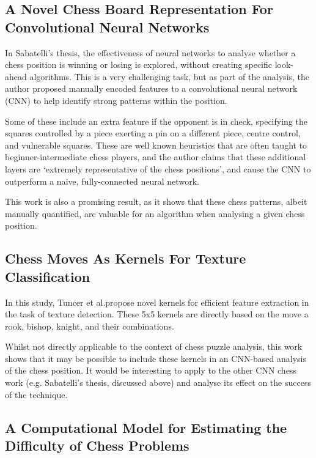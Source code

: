 \subsection{A Novel Chess Board Representation For Convolutional Neural Networks}

In Sabatelli's thesis,\cite{chessCNN} the effectiveness of neural networks to
analyse whether a chess position is winning or losing is explored, without
creating specific look-ahead algorithms. This is a very challenging task, but
as part of the analysis, the author proposed manually encoded features to a
convolutional neural network (CNN) to help identify strong patterns within the
position. 

Some of these include an extra feature if the opponent is in check, specifying
the squares controlled by a piece exerting a pin on a different piece, centre
control, and vulnerable squares.\cite{chessCNN} These are well known
heuristics that are often taught to beginner-intermediate chess players, and
the author claims that these additional layers are `extremely representative
of the chess positions', and cause the CNN to outperform a naive,
fully-connected neural network.

This work is also a promising result, as it shows that these chess patterns,
albeit manually quantified, are valuable for an algorithm when analysing a
given chess position.

\subsection{Chess Moves As Kernels For Texture Classification}

In this study, Tuncer et al.\@ propose novel kernels for efficient feature
extraction in the task of texture detection.\cite{chessKernel} These 5x5
kernels are directly based on the move a rook, bishop, knight, and their
combinations. 

Whilst not directly applicable to the context of chess puzzle analysis, this
work shows that it may be possible to include these kernels in an CNN-based
analysis of the chess position. It would be interesting to apply to the other
CNN chess work (e.g. Sabatelli's thesis,\cite{chessCNN} discussed above) and
analyse its effect on the success of the technique.

\subsection{A Computational Model for Estimating the Difficulty of Chess
Problems} \label{chessTreesOverview}

